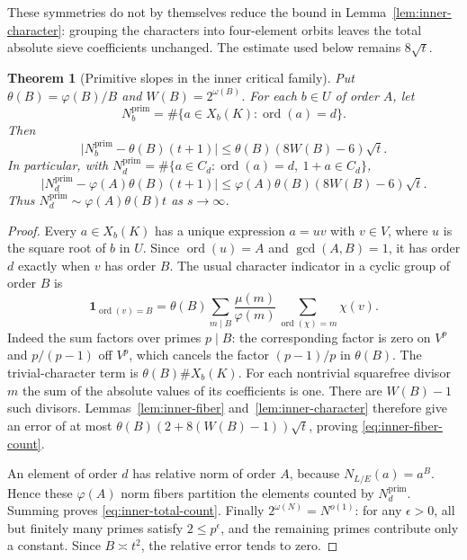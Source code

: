 \documentclass[11pt]{article}
\newtheorem{theorem}{Theorem}[section]
\begin{document}
These symmetries do not by themselves reduce the bound in
Lemma~\ref{lem:inner-character}: grouping the characters into
four-element orbits leaves the total absolute sieve coefficients
unchanged. The estimate used below remains $8\sqrt t$.

\begin{theorem}[Primitive slopes in the inner critical family]
\label{thm:inner-primitive-count}
Put $\theta(B)=\varphi(B)/B$ and $W(B)=2^{\omega(B)}$.
For each $b\in U$ of order $A$, let
\[
 N_b^{\mathrm{prim}}=\#\{a\in X_b(K):\operatorname{ord}(a)=d\}.
\]
Then
\begin{equation}\label{eq:inner-fiber-count}
 \bigl|N_b^{\mathrm{prim}}-\theta(B)(t+1)\bigr|
 \le\theta(B)(8W(B)-6)\sqrt t.
\end{equation}
In particular, with
$N_d^{\mathrm{prim}}=\#\{a\in C_d:\operatorname{ord}(a)=d,\ 1+a\in C_d\}$,
\begin{equation}\label{eq:inner-total-count}
 \bigl|N_d^{\mathrm{prim}}-\varphi(A)\theta(B)(t+1)\bigr|
 \le\varphi(A)\theta(B)(8W(B)-6)\sqrt t.
\end{equation}
Thus $N_d^{\mathrm{prim}}\sim\varphi(A)\theta(B)t$ as $s\to\infty$.
\end{theorem}
\begin{proof}
Every $a\in X_b(K)$ has a unique expression $a=uv$ with
$v\in V$, where $u$ is the square root of $b$ in $U$.
Since $\operatorname{ord}(u)=A$ and $\gcd(A,B)=1$, it has order
$d$ exactly when $v$ has order $B$.
The usual character indicator in a cyclic group of order $B$ is
\[
 \mathbf1_{\operatorname{ord}(v)=B}
 =\theta(B)\sum_{m\mid B}\frac{\mu(m)}{\varphi(m)}
   \sum_{\operatorname{ord}(\chi)=m}\chi(v).
\]
Indeed the sum factors over primes $p\mid B$: the corresponding
factor is zero on $V^p$ and $p/(p-1)$ off $V^p$, which cancels
the factor $(p-1)/p$ in $\theta(B)$.
The trivial-character term is $\theta(B)\#X_b(K)$.
For each nontrivial squarefree divisor $m$ the sum of the absolute
values of its coefficients is one. There are $W(B)-1$ such
divisors. Lemmas~\ref{lem:inner-fiber} and~\ref{lem:inner-character}
therefore give an error of at most
$\theta(B)(2+8(W(B)-1))\sqrt t$, proving
\eqref{eq:inner-fiber-count}.

An element of order $d$ has relative norm of order $A$, because
$N_{L/E}(a)=a^B$. Hence these $\varphi(A)$ norm fibers partition
the elements counted by $N_d^{\mathrm{prim}}$. Summing proves
\eqref{eq:inner-total-count}. Finally $2^{\omega(N)}=N^{o(1)}$:
for any $\epsilon>0$, all but finitely many primes satisfy
$2\le p^\epsilon$, and the remaining primes contribute only a
constant. Since $B\asymp t^2$, the relative error tends to zero.
\end{proof}
\end{document}
